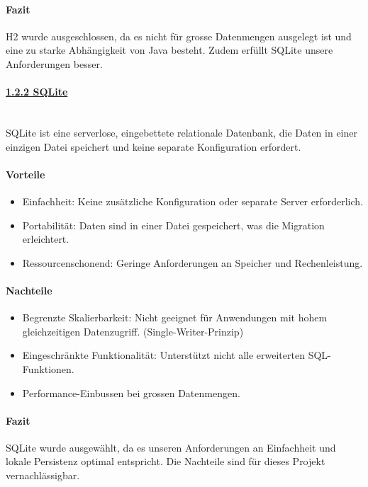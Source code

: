 \documentclass[a4paper,12pt]{report}
\begin{document}
    \paragraph*{Fazit}
    H2 wurde ausgeschlossen, da es nicht für grosse Datenmengen ausgelegt ist und eine zu starke Abhängigkeit von Java besteht.
    Zudem erfüllt SQLite unsere Anforderungen besser.

    \paragraph*{\underline{1.2.2 SQLite}}\mbox{}\\
    SQLite ist eine serverlose, eingebettete relationale Datenbank, die Daten in einer einzigen Datei speichert und keine separate Konfiguration erfordert.

    \paragraph*{Vorteile}
    \begin{itemize}
        \item Einfachheit: Keine zusätzliche Konfiguration oder separate Server erforderlich.
        \item Portabilität: Daten sind in einer Datei gespeichert, was die Migration erleichtert.
        \item Ressourcenschonend: Geringe Anforderungen an Speicher und Rechenleistung.
    \end{itemize}

    \paragraph*{Nachteile}
    \begin{itemize}
        \item Begrenzte Skalierbarkeit: Nicht geeignet für Anwendungen mit hohem gleichzeitigen Datenzugriff.
        (Single-Writer-Prinzip)
        \item Eingeschränkte Funktionalität: Unterstützt nicht alle erweiterten SQL-Funktionen.
        \item Performance-Einbussen bei grossen Datenmengen.
    \end{itemize}

    \paragraph*{Fazit}
    SQLite wurde ausgewählt, da es unseren Anforderungen an Einfachheit und lokale Persistenz optimal entspricht.
    Die Nachteile sind für dieses Projekt vernachlässigbar.
\end{document}
